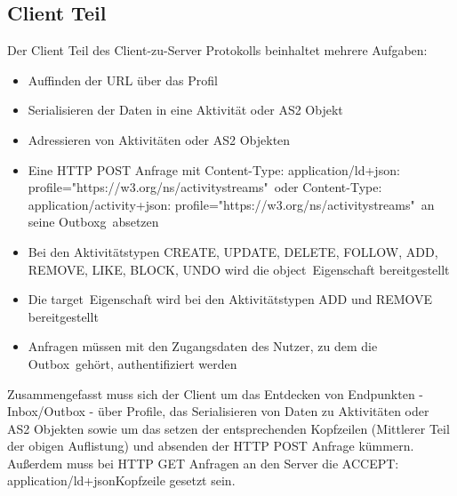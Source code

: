 	\subsection{Client Teil}
		Der Client Teil des Client-zu-Server Protokolls beinhaltet mehrere Aufgaben:
		\begin{itemize}
			\item Auffinden der URL über das Profil
			\item Serialisieren der Daten in eine Aktivität oder AS2 Objekt
			\item Adressieren von Aktivitäten oder AS2 Objekten
			\item Eine HTTP POST Anfrage mit \glqq Content-Type: application/ld+json: profile="https://w3.org/ns/activitystreams"\grqq~oder \glqq Content-Type: application/activity+json: profile="https://w3.org/ns/activitystreams"\grqq~an seine \glqq Outboxg\grqq~absetzen
			\item Bei den Aktivitätstypen CREATE, UPDATE, DELETE, FOLLOW, ADD, REMOVE, LIKE, BLOCK, UNDO wird die \glqq object\grqq~Eigenschaft bereitgestellt
			\item Die \glqq target\grqq~Eigenschaft wird bei den Aktivitätstypen ADD und REMOVE bereitgestellt
			\item Anfragen müssen mit den Zugangsdaten des Nutzer, zu dem die \glqq Outbox\grqq~gehört, authentifiziert werden
		\end{itemize}
		Zusammengefasst muss sich der Client um das Entdecken von Endpunkten - Inbox/Outbox - über Profile, das Serialisieren von Daten zu Aktivitäten oder AS2 Objekten sowie um das setzen der entsprechenden Kopfzeilen (Mittlerer Teil der obigen Auflistung) und absenden der HTTP POST Anfrage kümmern. Außerdem muss bei HTTP GET Anfragen an den Server die \glqq ACCEPT: application/ld+json\grqq Kopfzeile gesetzt sein.
		
